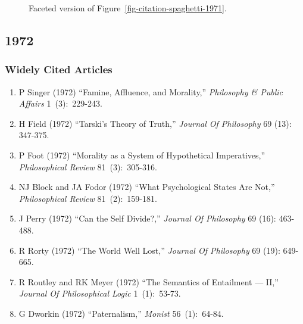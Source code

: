 \documentclass[
  10pt,
  letterpaper,
  DIV=11,
  numbers=noendperiod,
  twoside]{scrartcl}
\providecommand{\tightlist}{%
  \setlength{\itemsep}{0pt}\setlength{\parskip}{0pt}}\usepackage{longtable,booktabs,array}
\begin{document}
\begin{figure}


\caption{\label{fig-citation-facet-1971}Faceted version of
Figure~\ref{fig-citation-spaghetti-1971}.}

\end{figure}%

\newpage

\subsection{1972}\label{sec-s1972}

\subsubsection*{Widely Cited Articles}\label{widely-cited-articles-15}

\begin{enumerate}
\def\labelenumi{\arabic{enumi}.}
\tightlist
\item
  P Singer (1972) ``Famine, Affluence, and Morality,'' \emph{Philosophy
  \& Public Affairs} 1~(3):~229-243.
\item
  H Field (1972) ``Tarski's Theory of Truth,'' \emph{Journal Of
  Philosophy} 69 (13): 347-375.
\item
  P Foot (1972) ``Morality as a System of Hypothetical Imperatives,''
  \emph{Philosophical Review} 81~(3):~305-316.
\item
  NJ Block and JA Fodor (1972) ``What Psychological States Are Not,''
  \emph{Philosophical Review} 81~(2):~159-181.
\item
  J Perry (1972) ``Can the Self Divide?,'' \emph{Journal Of Philosophy}
  69 (16): 463-488.
\item
  R Rorty (1972) ``The World Well Lost,'' \emph{Journal Of Philosophy}
  69 (19): 649-665.
\item
  R Routley and RK Meyer (1972) ``The Semantics of Entailment --- II,''
  \emph{Journal Of Philosophical Logic} 1~(1):~53-73.
\item
  G Dworkin (1972) ``Paternalism,'' \emph{Monist} 56~(1):~64-84.
\end{enumerate}
\end{document}
